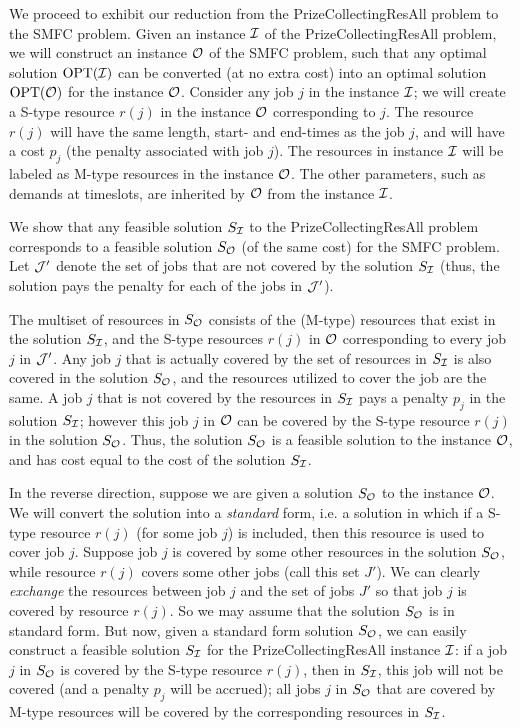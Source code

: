 \documentclass[11pt]{article}
\newcommand{\opt}{{\mathrm{OPT}}}
\newcommand{\I}{{\cal I}}
\renewcommand{\O}{{\cal O}}
\newcommand{\PCResAll}{{\sc PrizeCollectingResAll}}
\newcommand{\smfc}{{\sc SMFC}}
\newcommand{\cJ}{{\cal J}}
\begin{document}
We proceed to exhibit our reduction from the {\PCResAll} problem to the {\smfc} problem. 
Given an instance $\I$ of the {\PCResAll} problem, we will construct an instance $\O$ of the 
{\smfc} problem, such that any optimal solution $\opt(\I)$ can be converted (at no extra
cost) into an optimal solution $\opt(\O)$ for the instance $\O$. Consider any job $j$
in the instance $\I$; we will create a S-type resource $r(j)$ in the instance $\O$ corresponding to
$j$. The resource $r(j)$ will have the same length, start- and end-times as the job $j$, and will 
have a cost $p_j$ (the penalty associated with job $j$). The resources in instance $\I$ 
will be labeled as M-type resources in the instance $\O$. The other parameters, such as 
demands at timeslots, are inherited by $\O$ from the instance $\I$. 

We show that 
any feasible solution $S_\I$ to the {\PCResAll} problem corresponds to a feasible solution $S_\O$ (of the same cost) for the {\smfc} problem. Let ${\cal J}'$ denote the set of jobs that are not covered by the 
solution $S_\I$ (thus, the solution pays the penalty for each of the jobs in $\cJ'$).

The multiset of resources in $S_\O$ consists of the (M-type) resources that exist in the solution $S_\I$, and 
the S-type resources $r(j)$ in $\O$ corresponding to every job $j$ in $\cJ'$. 
Any job $j$ that is actually covered by the set of resources in $S_\I$ is also covered
in the solution $S_\O$, and the resources utilized to cover the job are the same. A job $j$ that is 
not covered by the resources in $S_\I$ pays a penalty $p_j$ in the solution $S_\I$; however this 
job $j$ in $\O$ can be covered by the S-type resource $r(j)$ in the solution 
$S_\O$. Thus, the solution $S_\O$ is a feasible solution to the instance $\O$, and has cost 
equal to the cost of the solution $S_\I$. 

In the reverse direction, suppose we are given a solution $S_\O$ to the instance $\O$. 
We will convert the solution into a {\em standard} form, i.e. a solution in which if a 
S-type resource $r(j)$ (for some job $j$) is included, then this resource is used to 
cover job $j$. Suppose job $j$ is covered by some other resources in the solution 
$S_\O$, while resource $r(j)$ covers some other jobs (call this set $J'$). We can clearly {\em exchange}
the resources between job $j$ and the set of jobs $J'$ so that job $j$ is covered by
resource $r(j)$. So we may assume that the solution $S_\O$ is in standard form. 
But now, given a standard form solution $S_\O$, we can easily construct a 
feasible solution $S_\I$ for the {\PCResAll} instance $\I$: if a job $j$ in $S_\O$ 
is covered by the S-type resource $r(j)$, then in $S_\I$, this job will not be 
covered (and a penalty $p_j$ will be accrued); all jobs $j$ in $S_\O$ that are 
covered by M-type resources will be covered by the corresponding resources
in $S_\I$.
\end{document}
